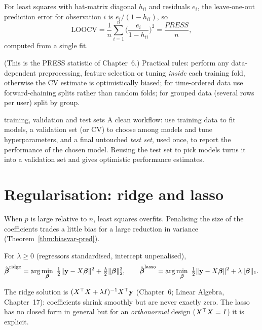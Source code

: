 \begin{theorem}\label{thm:loocv}
For least squares with hat-matrix diagonal $h_{ii}$ and residuals $e_i$, the leave-one-out prediction error for observation $i$ is $e_i/(1-h_{ii})$, so
\[ \mathrm{LOOCV}=\frac1n\sum_{i=1}^n\Big(\frac{e_i}{1-h_{ii}}\Big)^2=\frac{PRESS}n, \]
computed from a single fit.
\end{theorem}

(This is the PRESS statistic of Chapter~6.) Practical rules: perform any data-dependent preprocessing, feature selection or tuning \emph{inside} each training fold, otherwise the CV estimate is optimistically biased; for time-ordered data use forward-chaining splits rather than random folds; for grouped data (several rows per user) split by group.

\begin{interview}{training, validation and test sets}
A clean workflow: use training data to fit models, a validation set (or CV) to choose among models and tune hyperparameters, and a final untouched \emph{test set}, used once, to report the performance of the chosen model. Reusing the test set to pick models turns it into a validation set and gives optimistic performance estimates.
\end{interview}

\section{Regularisation: ridge and lasso}

When $p$ is large relative to $n$, least squares overfits. Penalising the size of the coefficients trades a little bias for a large reduction in variance (Theorem~\ref{thm:biasvar-pred}).

\begin{definition}
For $\lambda\ge0$ (regressors standardised, intercept unpenalised),
\[ \hat{\boldsymbol\beta}^{\mathrm{ridge}}=\arg\min_{\boldsymbol\beta}\ \tfrac12\norm{\mathbf{y}-X\boldsymbol\beta}^2+\tfrac\lambda2\norm{\boldsymbol\beta}_2^2,\qquad\hat{\boldsymbol\beta}^{\mathrm{lasso}}=\arg\min_{\boldsymbol\beta}\ \tfrac12\norm{\mathbf{y}-X\boldsymbol\beta}^2+\lambda\norm{\boldsymbol\beta}_1. \]
\end{definition}

The ridge solution is $(X^{\top} X+\lambda I)^{-1}X^{\top}\mathbf{y}$ (Chapter~6; Linear Algebra, Chapter~17): coefficients shrink smoothly but are never exactly zero. The lasso has no closed form in general but for an \emph{orthonormal} design ($X^{\top} X=I$) it is explicit.

